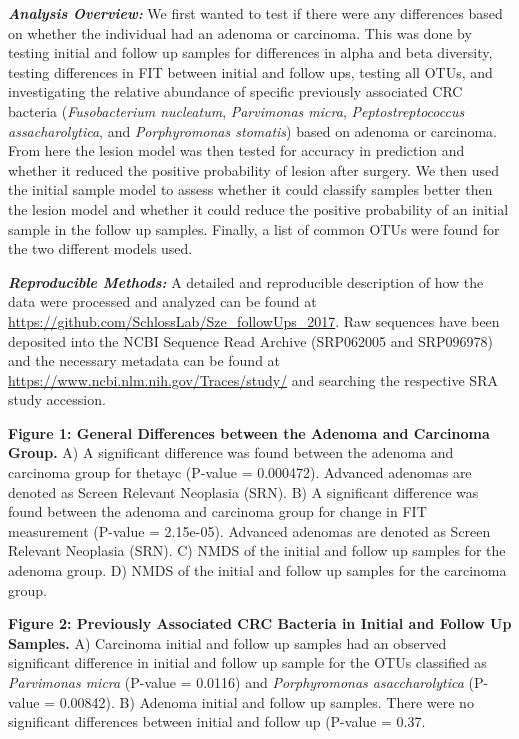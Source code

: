 \documentclass[12pt,]{article}
\begin{document}
\textbf{\emph{Analysis Overview:}} We first wanted to test if there were
any differences based on whether the individual had an adenoma or
carcinoma. This was done by testing initial and follow up samples for
differences in alpha and beta diversity, testing differences in FIT
between initial and follow ups, testing all OTUs, and investigating the
relative abundance of specific previously associated CRC bacteria
(\emph{Fusobacterium nucleatum}, \emph{Parvimonas micra},
\emph{Peptostreptococcus assacharolytica}, and \emph{Porphyromonas
stomatis}) based on adenoma or carcinoma. From here the lesion model was
then tested for accuracy in prediction and whether it reduced the
positive probability of lesion after surgery. We then used the initial
sample model to assess whether it could classify samples better then the
lesion model and whether it could reduce the positive probability of an
initial sample in the follow up samples. Finally, a list of common OTUs
were found for the two different models used.

\textbf{\emph{Reproducible Methods:}} A detailed and reproducible
description of how the data were processed and analyzed can be found at
\url{https://github.com/SchlossLab/Sze_followUps_2017}. Raw sequences
have been deposited into the NCBI Sequence Read Archive (SRP062005 and
SRP096978) and the necessary metadata can be found at
\url{https://www.ncbi.nlm.nih.gov/Traces/study/} and searching the
respective SRA study accession.

\newpage

\textbf{Figure 1: General Differences between the Adenoma and Carcinoma
Group.} A) A significant difference was found between the adenoma and
carcinoma group for thetayc (P-value = 0.000472). Advanced adenomas are
denoted as Screen Relevant Neoplasia (SRN). B) A significant difference
was found between the adenoma and carcinoma group for change in FIT
measurement (P-value = 2.15e-05). Advanced adenomas are denoted as
Screen Relevant Neoplasia (SRN). C) NMDS of the initial and follow up
samples for the adenoma group. D) NMDS of the initial and follow up
samples for the carcinoma group.

\textbf{Figure 2: Previously Associated CRC Bacteria in Initial and
Follow Up Samples.} A) Carcinoma initial and follow up samples had an
observed significant difference in initial and follow up sample for the
OTUs classified as \emph{Parvimonas micra} (P-value = 0.0116) and
\emph{Porphyromonas asaccharolytica} (P-value = 0.00842). B) Adenoma
initial and follow up samples. There were no significant differences
between initial and follow up (P-value = 0.37.
\end{document}
